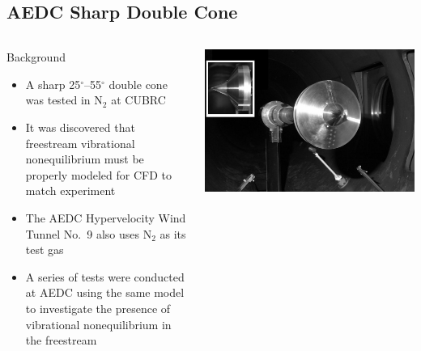 \documentclass[compress,11pt]{beamer}
\begin{document}


\subsection{AEDC Sharp Double Cone}
\frame
{
  \begin{columns}[t]
    \vspace{-1em}
    \begin{block}{Background}
      \footnotesize
      \begin{itemize}
        \item A sharp 25$^\circ$--55$^\circ$ double cone was tested in N$_2$ at CUBRC
	\item It was discovered that freestream vibrational nonequilibrium must be properly modeled for CFD to match experiment~\cite{nompelis_candler_holden_double_cone}
	\item The AEDC Hypervelocity Wind Tunnel No.~9 also uses N$_2$ as its test gas
	\item A series of tests were conducted at AEDC using the same model to investigate the presence of vibrational nonequilibrium in the freestream~\cite{AEDC_HVWT9_double_cone}
      \end{itemize}
    \end{block}
    
    \vspace{2em}    
    \includegraphics[width=\textwidth]{figures/aedc_double_cone/double_cone_HVWT9}
  \end{columns}
}
\end{document}
